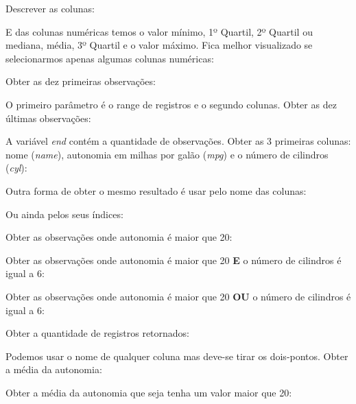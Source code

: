 \documentclass[a4paper,11pt]{article}
\begin{document}
Descrever as colunas: \\

E das colunas numéricas temos o valor mínimo, 1º Quartil, 2º Quartil ou mediana, média, 3º Quartil e o valor máximo. Fica melhor visualizado se selecionarmos apenas algumas colunas numéricas: \\

Obter as dez primeiras observações: \\

O primeiro parâmetro é o range de registros e o segundo colunas. Obter as dez últimas observações: \\

A variável \textit{end} contém a quantidade de observações. Obter as 3 primeiras colunas: nome (\textit{name}), autonomia em milhas por galão (\textit{mpg}) e o número de cilindros (\textit{cyl}): \\

Outra forma de obter o mesmo resultado é usar pelo nome das colunas: \\

Ou ainda pelos seus índices: \\

Obter as observações onde autonomia é maior que 20: \\

Obter as observações onde autonomia é maior que 20 \textbf{E} o número de cilindros é igual a 6: \\

Obter as observações onde autonomia é maior que 20 \textbf{OU} o número de cilindros é igual a 6: \\

Obter a quantidade de registros retornados: \\

Podemos usar o nome de qualquer coluna mas deve-se tirar os dois-pontos. Obter a média da autonomia: \\

Obter a média da autonomia que seja tenha um valor maior que 20: \\
\end{document}
